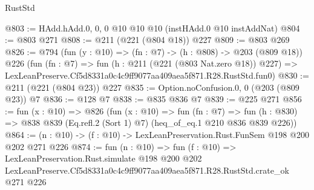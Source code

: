 \begin{lexlean}{RustStd}
\begin{coremodule}
@803 := HAdd.hAdd.{0, 0, 0} @10 @10 @10 (instHAdd.{0} @10 instAddNat)
@804 := @803 @271
@808 := @211 (@221 (@804 @18)) @227
@809 := @803 @269
@826 := @794
    (fun (y : @10) => (fn : @7) -> (h : @808) -> @203 (@809 @18))
    @226
    (fun (fn : @7) =>
    fun (h : @211 (@221 (@803 Nat.zero @18)) @227) =>
    LexLeanPreserve.Cf5d8331a0c4c9ff9077aa409aea5f871.R28.RustStd.fun0)
@830 := @211 (@221 (@804 @23)) @227
@835 := Option.noConfusion.{0, 0} (@203 (@809 @23)) @7
@836 := @128 @7
@838 := @835 @836 @7
@839 := @225 @271
@856 := fun (x : @10) =>
  @826
    (fun (x : @10) =>
    fun (fn : @7) =>
    fun (h : @830) => @838 @839 (Eq.refl.{2} (Sort 1) @7) (heq_of_eq.{1} @210 @836 @839 @226))
@864 := (n : @10) -> (f : @10) -> LexLeanPreservation.Rust.FunSem @198 @200 @202 @271 @226
@874 := fun (n : @10) =>
  fun (f : @10) =>
  LexLeanPreservation.Rust.simulate
    @198
    @200
    @202
    LexLeanPreserve.Cf5d8331a0c4c9ff9077aa409aea5f871.R28.RustStd.crate_ok
    @271
    @226
\end{coremodule}
\end{lexlean}
